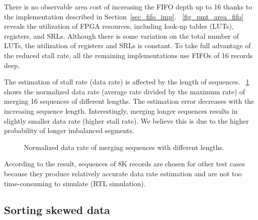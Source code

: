 \documentclass[10pt, conference]{IEEEtran}
\begin{document}
There is no observable area cost of increasing the FIFO depth up to 16 thanks to the implementation described in Section~\ref{sec_fifo_imp}.
\figurename~\ref{fig_pmt_area_fifo} reveals the utilization of FPGA resources, including look-up tables (LUTs), registers, and SRLs.
Although there is some variation on the total number of LUTs, the utilization of registers and SRLs is constant.
To take full advantage of the reduced stall rate, all the remaining implementations use FIFOs of 16 records deep.

The estimation of stall rate (data rate) is affected by the length of sequences.
\figurename~\ref{fig_seq_len} shows the normalized data rate (average rate divided by the maximum rate) of merging 16 sequences of different lengths.
The estimation error decreases with the increasing sequence length.
Interestingly, merging longer sequences results in slightly smaller data rate (higher stall rate).
We believe this is due to the higher probability of longer imbalanced segments.

\begin{figure}[bt]
\caption{Normalized data rate of merging sequences with different lengths.}\label{fig_seq_len}
\end{figure}

According to the result, sequences of 8K records are chosen for other test cases
because they produce relatively accurate data rate estimation and are not too time-consuming to simulate (RTL simulation).

\subsection{Sorting skewed data}\label{sec_skewed_data}
\end{document}
